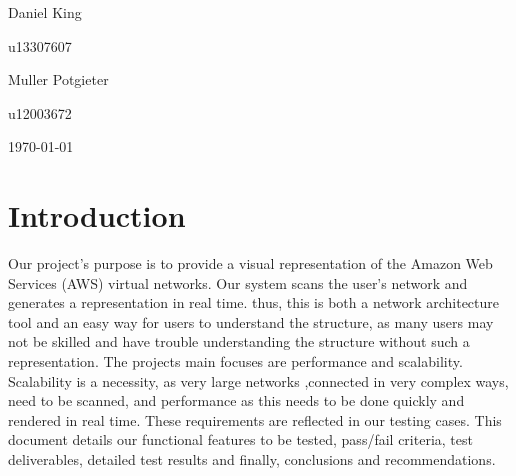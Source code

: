 \documentclass[hidelinks,a4paper,12pt]{article}
\begin{document}
\begin{titlepage}
\begin{center}
\begin{minipage}{0.4\textwidth}
\begin{flushleft} \large
Daniel {King}
\end{flushleft}
\end{minipage}
\begin{minipage}{0.4\textwidth}
\begin{flushright} \large
\emph{}
u13307607
\end{flushright}
\end{minipage}

\begin{minipage}{0.4\textwidth}
\begin{flushleft} \large
Muller {Potgieter}
\end{flushleft}
\end{minipage}
\begin{minipage}{0.4\textwidth}
\begin{flushright} \large
\emph{}
u12003672
\end{flushright}
\end{minipage}

\vfill
{\large \today}
\end{center}
\end{titlepage}
\footnotesize
%
\normalsize


\tableofcontents
\newpage
{}

\newpage
\section{Introduction} 
Our project's purpose is to provide a visual representation of the Amazon Web Services (AWS) virtual networks. Our system scans the user's network and generates a representation in real time. thus, this is both a network architecture tool and an easy way for users to understand the structure, as many users may not be skilled and have trouble understanding the structure without such a representation. The projects main focuses are performance and scalability. Scalability is a necessity, as very large networks ,connected in very complex ways, need to be scanned, and performance as this needs to be done quickly and rendered in real time. These requirements are reflected in our testing cases. This document details our functional features to be tested, pass/fail criteria, test deliverables, detailed test results and finally, conclusions and recommendations.
\end{document}

